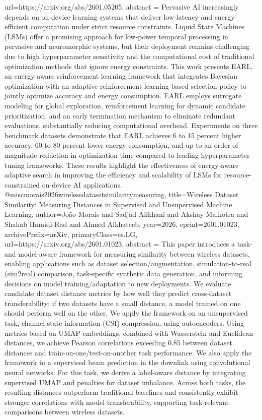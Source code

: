 {      url={https://arxiv.org/abs/2601.05205},
      abstract = {Pervasive AI increasingly depends on on-device learning systems that deliver low-latency and energy-efficient computation under strict resource constraints. Liquid State Machines (LSMs) offer a promising approach for low-power temporal processing in pervasive and neuromorphic systems, but their deployment remains challenging due to high hyperparameter sensitivity and the computational cost of traditional optimization methods that ignore energy constraints. This work presents EARL, an energy-aware reinforcement learning framework that integrates Bayesian optimization with an adaptive reinforcement learning based selection policy to jointly optimize accuracy and energy consumption. EARL employs surrogate modeling for global exploration, reinforcement learning for dynamic candidate prioritization, and an early termination mechanism to eliminate redundant evaluations, substantially reducing computational overhead. Experiments on three benchmark datasets demonstrate that EARL achieves 6 to 15 percent higher accuracy, 60 to 80 percent lower energy consumption, and up to an order of magnitude reduction in optimization time compared to leading hyperparameter tuning frameworks. These results highlight the effectiveness of energy-aware adaptive search in improving the efficiency and scalability of LSMs for resource-constrained on-device AI applications.}
}@misc{morais2026wirelessdatasetsimilaritymeasuring,
      title={Wireless Dataset Similarity: Measuring Distances in Supervised and Unsupervised Machine Learning}, 
      author={João Morais and Sadjad Alikhani and Akshay Malhotra and Shahab Hamidi-Rad and Ahmed Alkhateeb},
      year={2026},
      eprint={2601.01023},
      archivePrefix={arXiv},
      primaryClass={cs.LG},
      url={https://arxiv.org/abs/2601.01023},
      abstract = {This paper introduces a task- and model-aware framework for measuring similarity between wireless datasets, enabling applications such as dataset selection/augmentation, simulation-to-real (sim2real) comparison, task-specific synthetic data generation, and informing decisions on model training/adaptation to new deployments. We evaluate candidate dataset distance metrics by how well they predict cross-dataset transferability: if two datasets have a small distance, a model trained on one should perform well on the other. We apply the framework on an unsupervised task, channel state information (CSI) compression, using autoencoders. Using metrics based on UMAP embeddings, combined with Wasserstein and Euclidean distances, we achieve Pearson correlations exceeding 0.85 between dataset distances and train-on-one/test-on-another task performance. We also apply the framework to a supervised beam prediction in the downlink using convolutional neural networks. For this task, we derive a label-aware distance by integrating supervised UMAP and penalties for dataset imbalance. Across both tasks, the resulting distances outperform traditional baselines and consistently exhibit stronger correlations with model transferability, supporting task-relevant comparisons between wireless datasets.}
}
